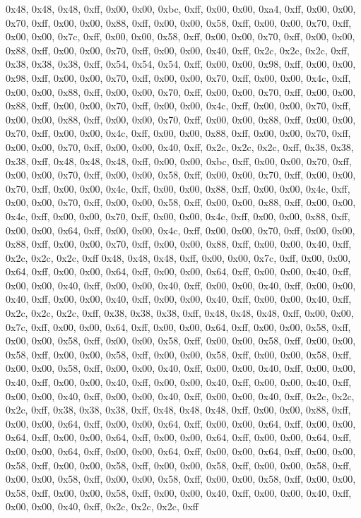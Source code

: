 0x48, 0x48, 0x48, 0xff, 0x00, 0x00, 0xbc, 0xff, 0x00, 0x00, 0xa4, 0xff, 0x00, 0x00, 0x70, 0xff, 0x00, 0x00, 0x88, 0xff, 0x00, 0x00, 0x58, 0xff, 0x00, 0x00, 0x70, 0xff, 0x00, 0x00, 0x7c, 0xff, 0x00, 0x00, 0x58, 0xff, 0x00, 0x00, 0x70, 0xff, 0x00, 0x00, 0x88, 0xff, 0x00, 0x00, 0x70, 0xff, 0x00, 0x00, 0x40, 0xff, 0x2c, 0x2c, 0x2c, 0xff, 0x38, 0x38, 0x38, 0xff, 0x54, 0x54, 0x54, 0xff, 0x00, 0x00, 0x98, 0xff, 0x00, 0x00, 0x98, 0xff, 0x00, 0x00, 0x70, 0xff, 0x00, 0x00, 0x70, 0xff, 0x00, 0x00, 0x4c, 0xff, 0x00, 0x00, 0x88, 0xff, 0x00, 0x00, 0x70, 0xff, 0x00, 0x00, 0x70, 0xff, 0x00, 0x00, 0x88, 0xff, 0x00, 0x00, 0x70, 0xff, 0x00, 0x00, 0x4c, 0xff, 0x00, 0x00, 0x70, 0xff, 0x00, 0x00, 0x88, 0xff, 0x00, 0x00, 0x70, 0xff, 0x00, 0x00, 0x88, 0xff, 0x00, 0x00, 0x70, 0xff, 0x00, 0x00, 0x4c, 0xff, 0x00, 0x00, 0x88, 0xff, 0x00, 0x00, 0x70, 0xff, 0x00, 0x00, 0x70, 0xff, 0x00, 0x00, 0x40, 0xff, 0x2c, 0x2c, 0x2c, 0xff, 0x38, 0x38, 0x38, 0xff, 0x48, 0x48, 0x48, 0xff, 0x00, 0x00, 0xbc, 0xff, 0x00, 0x00, 0x70, 0xff, 0x00, 0x00, 0x70, 0xff, 0x00, 0x00, 0x58, 0xff, 0x00, 0x00, 0x70, 0xff, 0x00, 0x00, 0x70, 0xff, 0x00, 0x00, 0x4c, 0xff, 0x00, 0x00, 0x88, 0xff, 0x00, 0x00, 0x4c, 0xff, 0x00, 0x00, 0x70, 0xff, 0x00, 0x00, 0x58, 0xff, 0x00, 0x00, 0x88, 0xff, 0x00, 0x00, 0x4c, 0xff, 0x00, 0x00, 0x70, 0xff, 0x00, 0x00, 0x4c, 0xff, 0x00, 0x00, 0x88, 0xff, 0x00, 0x00, 0x64, 0xff, 0x00, 0x00, 0x4c, 0xff, 0x00, 0x00, 0x70, 0xff, 0x00, 0x00, 0x88, 0xff, 0x00, 0x00, 0x70, 0xff, 0x00, 0x00, 0x88, 0xff, 0x00, 0x00, 0x40, 0xff, 0x2c, 0x2c, 0x2c, 0xff
0x48, 0x48, 0x48, 0xff, 0x00, 0x00, 0x7c, 0xff, 0x00, 0x00, 0x64, 0xff, 0x00, 0x00, 0x64, 0xff, 0x00, 0x00, 0x64, 0xff, 0x00, 0x00, 0x40, 0xff, 0x00, 0x00, 0x40, 0xff, 0x00, 0x00, 0x40, 0xff, 0x00, 0x00, 0x40, 0xff, 0x00, 0x00, 0x40, 0xff, 0x00, 0x00, 0x40, 0xff, 0x00, 0x00, 0x40, 0xff, 0x00, 0x00, 0x40, 0xff, 0x2c, 0x2c, 0x2c, 0xff, 0x38, 0x38, 0x38, 0xff, 0x48, 0x48, 0x48, 0xff, 0x00, 0x00, 0x7c, 0xff, 0x00, 0x00, 0x64, 0xff, 0x00, 0x00, 0x64, 0xff, 0x00, 0x00, 0x58, 0xff, 0x00, 0x00, 0x58, 0xff, 0x00, 0x00, 0x58, 0xff, 0x00, 0x00, 0x58, 0xff, 0x00, 0x00, 0x58, 0xff, 0x00, 0x00, 0x58, 0xff, 0x00, 0x00, 0x58, 0xff, 0x00, 0x00, 0x58, 0xff, 0x00, 0x00, 0x58, 0xff, 0x00, 0x00, 0x40, 0xff, 0x00, 0x00, 0x40, 0xff, 0x00, 0x00, 0x40, 0xff, 0x00, 0x00, 0x40, 0xff, 0x00, 0x00, 0x40, 0xff, 0x00, 0x00, 0x40, 0xff, 0x00, 0x00, 0x40, 0xff, 0x00, 0x00, 0x40, 0xff, 0x00, 0x00, 0x40, 0xff, 0x2c, 0x2c, 0x2c, 0xff, 0x38, 0x38, 0x38, 0xff, 0x48, 0x48, 0x48, 0xff, 0x00, 0x00, 0x88, 0xff, 0x00, 0x00, 0x64, 0xff, 0x00, 0x00, 0x64, 0xff, 0x00, 0x00, 0x64, 0xff, 0x00, 0x00, 0x64, 0xff, 0x00, 0x00, 0x64, 0xff, 0x00, 0x00, 0x64, 0xff, 0x00, 0x00, 0x64, 0xff, 0x00, 0x00, 0x64, 0xff, 0x00, 0x00, 0x64, 0xff, 0x00, 0x00, 0x64, 0xff, 0x00, 0x00, 0x58, 0xff, 0x00, 0x00, 0x58, 0xff, 0x00, 0x00, 0x58, 0xff, 0x00, 0x00, 0x58, 0xff, 0x00, 0x00, 0x58, 0xff, 0x00, 0x00, 0x58, 0xff, 0x00, 0x00, 0x58, 0xff, 0x00, 0x00, 0x58, 0xff, 0x00, 0x00, 0x58, 0xff, 0x00, 0x00, 0x40, 0xff, 0x00, 0x00, 0x40, 0xff, 0x00, 0x00, 0x40, 0xff, 0x2c, 0x2c, 0x2c, 0xff
